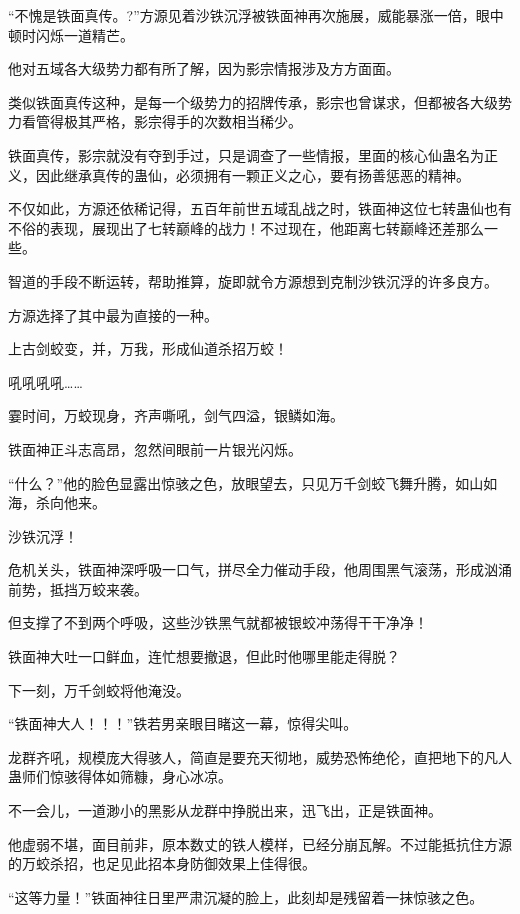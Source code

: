 
\begin{this_body}

“不愧是铁面真传。?”方源见着沙铁沉浮被铁面神再次施展，威能暴涨一倍，眼中顿时闪烁一道精芒。

他对五域各大级势力都有所了解，因为影宗情报涉及方方面面。

类似铁面真传这种，是每一个级势力的招牌传承，影宗也曾谋求，但都被各大级势力看管得极其严格，影宗得手的次数相当稀少。

铁面真传，影宗就没有夺到手过，只是调查了一些情报，里面的核心仙蛊名为正义，因此继承真传的蛊仙，必须拥有一颗正义之心，要有扬善惩恶的精神。

不仅如此，方源还依稀记得，五百年前世五域乱战之时，铁面神这位七转蛊仙也有不俗的表现，展现出了七转巅峰的战力！不过现在，他距离七转巅峰还差那么一些。

智道的手段不断运转，帮助推算，旋即就令方源想到克制沙铁沉浮的许多良方。

方源选择了其中最为直接的一种。

上古剑蛟变，并，万我，形成仙道杀招万蛟！

吼吼吼吼……

霎时间，万蛟现身，齐声嘶吼，剑气四溢，银鳞如海。

铁面神正斗志高昂，忽然间眼前一片银光闪烁。

“什么？”他的脸色显露出惊骇之色，放眼望去，只见万千剑蛟飞舞升腾，如山如海，杀向他来。

沙铁沉浮！

危机关头，铁面神深呼吸一口气，拼尽全力催动手段，他周围黑气滚荡，形成汹涌前势，抵挡万蛟来袭。

但支撑了不到两个呼吸，这些沙铁黑气就都被银蛟冲荡得干干净净！

铁面神大吐一口鲜血，连忙想要撤退，但此时他哪里能走得脱？

下一刻，万千剑蛟将他淹没。

“铁面神大人！！！”铁若男亲眼目睹这一幕，惊得尖叫。

龙群齐吼，规模庞大得骇人，简直是要充天彻地，威势恐怖绝伦，直把地下的凡人蛊师们惊骇得体如筛糠，身心冰凉。

不一会儿，一道渺小的黑影从龙群中挣脱出来，迅飞出，正是铁面神。

他虚弱不堪，面目前非，原本数丈的铁人模样，已经分崩瓦解。不过能抵抗住方源的万蛟杀招，也足见此招本身防御效果上佳得很。

“这等力量！”铁面神往日里严肃沉凝的脸上，此刻却是残留着一抹惊骇之色。


\end{this_body}
